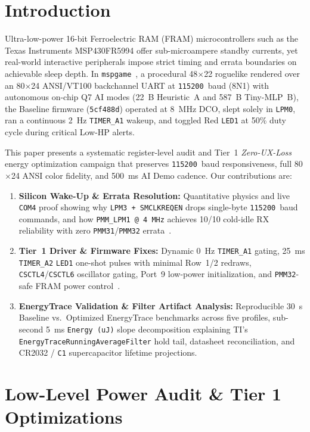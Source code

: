 \documentclass[conference]{IEEEtran}
\begin{document}
\section{Introduction}
Ultra-low-power 16-bit Ferroelectric RAM (FRAM) microcontrollers such as the Texas Instruments MSP430FR5994 offer sub-microampere standby currents, yet real-world interactive peripherals impose strict timing and errata boundaries on achievable sleep depth. In \texttt{mspgame}~\cite{mspgame_ga}, a procedural 48$\times$22 roguelike rendered over an 80$\times$24 ANSI/VT100 backchannel UART at \texttt{115200}~baud (8N1) with autonomous on-chip Q7 AI modes (22~B Heuristic~A and 587~B Tiny-MLP~B), the Baseline firmware (\texttt{5cf488d}) operated at 8~MHz DCO, slept solely in \texttt{LPM0}, ran a continuous 2~Hz \texttt{TIMER\_A1} wakeup, and toggled Red \texttt{LED1} at 50\% duty cycle during critical Low-HP alerts.

This paper presents a systematic register-level audit and Tier~1 \emph{Zero-UX-Loss} energy optimization campaign that preserves \texttt{115200}~baud responsiveness, full 80$\times$24 ANSI color fidelity, and 500~ms AI Demo cadence. Our contributions are:
\begin{enumerate}
    \item \textbf{Silicon Wake-Up \& Errata Resolution:} Quantitative physics and live \texttt{COM4} proof showing why \texttt{LPM3 + SMCLKREQEN} drops single-byte \texttt{115200}~baud commands, and how \texttt{PMM\_LPM1 @ 4~MHz} achieves 10/10 cold-idle RX reliability with zero \texttt{PMM31}/\texttt{PMM32} errata~\cite{ti_ds,ti_errata}.
    \item \textbf{Tier~1 Driver \& Firmware Fixes:} Dynamic 0~Hz \texttt{TIMER\_A1} gating, 25~ms \texttt{TIMER\_A2} \texttt{LED1} one-shot pulses with minimal Row~1/2 redraws, \texttt{CSCTL4}/\texttt{CSCTL6} oscillator gating, Port~9 low-power initialization, and \texttt{PMM32}-safe FRAM power control~\cite{ti_ug}.
    \item \textbf{EnergyTrace Validation \& Filter Artifact Analysis:} Reproducible 30~s Baseline vs.\ Optimized EnergyTrace benchmarks across five profiles, sub-second 5~ms \texttt{Energy (uJ)} slope decomposition explaining TI's \texttt{EnergyTraceRunningAverageFilter} hold tail, datasheet reconciliation, and CR2032 / \texttt{C1} supercapacitor lifetime projections.
\end{enumerate}

\section{Low-Level Power Audit \& Tier 1 Optimizations}
\end{document}
